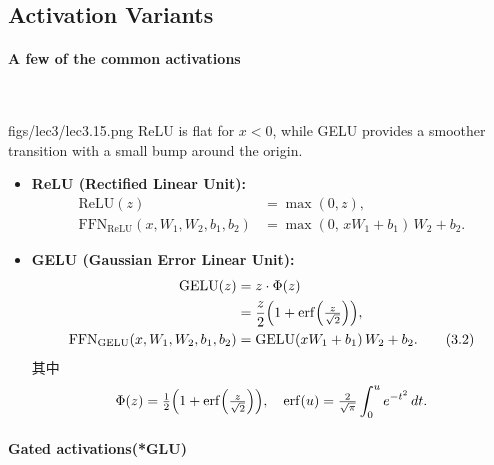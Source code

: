 \clearpage
\subsection{Activation Variants}
\paragraph{A few of the common activations}~{}

\MarginImageWithNote
  {figs/lec3/lec3.15.png}
  {}
  {ReLU is flat  for $x<0$, while GELU provides a smoother transition with a small bump around the origin.}

\begin{itemize}
  \item \textbf{ReLU (Rectified Linear Unit):}
  \begin{align*}
    \mathrm{ReLU}(z) &= \max(0, z), \\
    \mathrm{FFN}_{\mathrm{ReLU}}(x, W_1, W_2, b_1, b_2) 
      &= \max(0,\, xW_1+b_1)\,W_2 + b_2.
    \tag{3.1}
  \end{align*}

  \item \textbf{GELU (Gaussian Error Linear Unit):}
  \begin{align*}
    \mathrm{GELU}(z) &= z \cdot \Phi(z) \\
                     &= \frac{z}{2}\Bigl(1+\mathrm{erf}\!\left(\tfrac{z}{\sqrt{2}}\right)\Bigr), \\
    \mathrm{FFN}_{\mathrm{GELU}}(x, W_1, W_2, b_1, b_2) 
      &= \mathrm{GELU}(xW_1+b_1)\,W_2 + b_2.
    \tag{3.2}
  \end{align*}
  其中
  \[
  \Phi(z)=\tfrac{1}{2}\Bigl(1+\mathrm{erf}\!\left(\tfrac{z}{\sqrt{2}}\right)\Bigr),
  \quad
  \mathrm{erf}(u)=\tfrac{2}{\sqrt{\pi}}\int_0^u e^{-t^2}\,dt.
  \]
\end{itemize}


\paragraph{Gated activations(*GLU)}~{}


